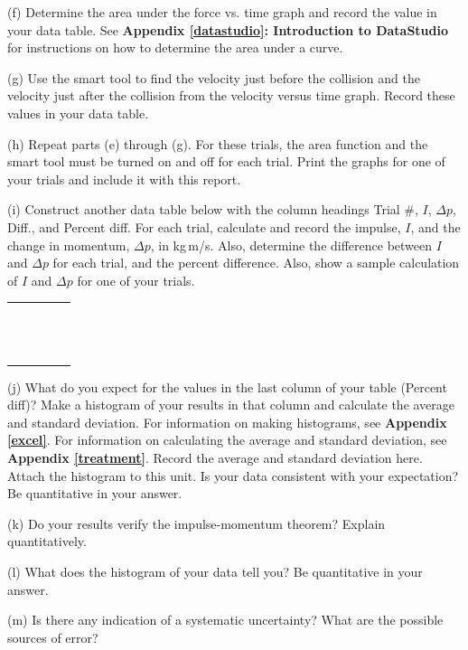 (f) Determine the area under the force vs. time graph and record the value in
your data table. See \textbf{Appendix \ref{datastudio}: Introduction to DataStudio} for instructions on how to determine the area under a curve.

(g) Use the smart tool to find the velocity just before the collision and the
velocity just after the collision from the velocity versus time graph. Record
these values in your data table.

(h) Repeat parts (e) through (g). For these trials, 
the area function and the smart tool must be turned on and off for each trial. 
Print the graphs for one of your trials and include it with this report.

\newpage

(i) Construct another data table below with the column headings
Trial \#, $I$, \( \Delta  p\), Diff., and Percent diff. For each trial, calculate and record
the impulse, $I$, and the change in momentum, \( \Delta  p\), in kg\,m/s. Also,
determine the difference between $I$ and $\Delta p$  for each trial, and the percent difference. Also, show a sample
calculation of $I$ and \( \Delta  p\) for one of your trials.

\begin{center}
\begin{tabular}{|p{1.0in}|p{1.0in}|p{1.0in}|p{1.0in}|p{1.0in}|} \hline
 & & & & \\ \hline
 & & & & \\
 & & & & \\
 & & & & \\
 & & & & \\
 & & & & \\
 & & & & \\
 & & & & \\
 & & & & \\
 & & & & \\
 & & & & \\
 & & & & \\
 & & & & \\
 & & & & \\ \hline
\end{tabular}
\end{center}

(j) What do you expect for the values in the last column of your table (Percent diff)? Make a histogram of your results in that column and calculate the average and standard deviation. For information on making histograms, see \textbf{Appendix \ref{excel}}. For information on calculating the average and standard deviation, see \textbf{Appendix \ref{treatment}}. Record the average and standard deviation here.
Attach the histogram to this unit.
Is your data consistent with your expectation?  Be quantitative in your answer.
\vspace{20mm}

(k) Do your results verify the impulse-momentum theorem? Explain quantitatively.
\vspace{20mm}

(l) What does the histogram of your data tell you? Be quantitative in your answer.
\vspace{20mm}

(m) Is there any indication of a systematic uncertainty? What are the possible
sources of error?

